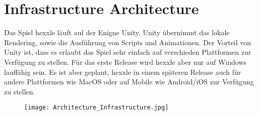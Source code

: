 \documentclass[../main.tex]{subfiles}
\begin{document}
    
    \section{Infrastructure Architecture}

    \par Das Spiel \gls{hexxle} läuft auf der Enigne Unity. Unity übernimmt das lokale Rendering, sowie die Ausführung von Scripts und Animationen. Der Vorteil von Unity ist, dass es erlaubt das Spiel sehr einfach auf verschieden Plattformen zur Verfügung zu stellen. Für das erste Release wird \gls{hexxle} aber nur auf Windows lauffähig sein. Es ist aber geplant, \gls{hexxle} in einem späteren Release auch für andere Plattformen wie MacOS oder auf Mobile wie Android/iOS zur Verfügung zu stellen.      

    \begin{figure}[H]
		\centering
		\texttt{[image: Architecture\_Infrastructure.jpg]}
	\end{figure}
\end{document}
